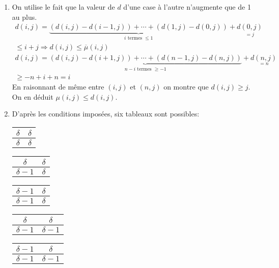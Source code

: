 \begin{enumerate}
\begin{enumerate}
  \item On utilise le fait que la valeur de $d$ d'une case à l'autre n'augmente que de 1 au plus.
\begin{multline*}
  d(i,j) = \underset{i \text{ termes } \leq 1}{\underbrace{\left( d(i,j)-d(i-1,j)\right) + \cdots + \left( d(1,j) - d(0,j)\right)}} + \underset{=j}{d(0,j)} \\
  \leq i + j \Rightarrow d(i,j) \leq \overline{\mu}(i,j)
\end{multline*}
\begin{multline*}
  d(i,j) = \underset{ n-i \text{ termes } \geq -1}{\underbrace{\left( d(i,j)-d(i+1,j)\right) + \cdots + \left(d(n-1,j)-d(n,j) \right)}} + \underset{=n}{d(n,j)} \\
  \geq -n + i +n = i
\end{multline*}
En raisonnant de même entre $(i,j)$ et $(n,j)$ on montre que $d(i,j)\geq j$. On en déduit $\mu(i,j) \leq d(i,j)$.
  \item D'après les conditions imposées, six tableaux sont possibles:
\begin{center}
\renewcommand {\arraystretch} {1.2}
\begin{tabular}{|c|c|} \hline
  $\delta$ & $\delta$ \\ \hline
  $\delta$ & $\delta$ \\ \hline  
\end{tabular}\hfill
\begin{tabular}{|c|c|} \hline
  $\delta$ & $\delta$ \\ \hline
  $\delta -1$ & $\delta$ \\ \hline  
\end{tabular}\hfill
\begin{tabular}{|c|c|} \hline
  $\delta - 1$ & $\delta$ \\ \hline
  $\delta - 1$ & $\delta$ \\ \hline  
\end{tabular}\hfill
\begin{tabular}{|c|c|} \hline
  $\delta$ & $\delta$ \\ \hline
  $\delta -1$ & $\delta -1$ \\ \hline  
\end{tabular}\hfill
\begin{tabular}{|c|c|} \hline
  $\delta - 1$ & $\delta$ \\ \hline
  $\delta -1$ & $\delta -1$ \\ \hline  
\end{tabular}\hfill 
\begin{tabular}{|c|c|} \hline

\end{tabular}
\end{center}
\end{enumerate}
\end{enumerate}
